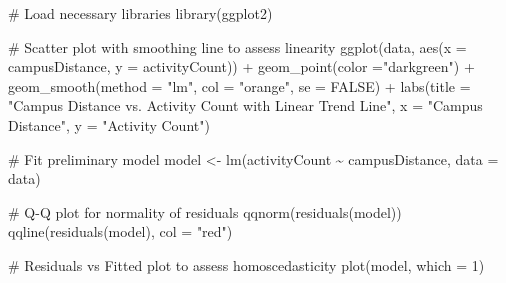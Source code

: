 \documentclass[
  letterpaper,
  DIV=11,
  numbers=noendperiod]{scrartcl}
\newenvironment{Shaded}{\begin{snugshade}}{\end{snugshade}}
\newcommand{\AttributeTok}[1]{\textcolor[rgb]{0.40,0.45,0.13}{#1}}
\newcommand{\CommentTok}[1]{\textcolor[rgb]{0.37,0.37,0.37}{#1}}
\newcommand{\ConstantTok}[1]{\textcolor[rgb]{0.56,0.35,0.01}{#1}}
\newcommand{\DecValTok}[1]{\textcolor[rgb]{0.68,0.00,0.00}{#1}}
\newcommand{\FunctionTok}[1]{\textcolor[rgb]{0.28,0.35,0.67}{#1}}
\newcommand{\NormalTok}[1]{\textcolor[rgb]{0.00,0.23,0.31}{#1}}
\newcommand{\OtherTok}[1]{\textcolor[rgb]{0.00,0.23,0.31}{#1}}
\newcommand{\SpecialCharTok}[1]{\textcolor[rgb]{0.37,0.37,0.37}{#1}}
\newcommand{\StringTok}[1]{\textcolor[rgb]{0.13,0.47,0.30}{#1}}
\begin{document}
\begin{Shaded}
\begin{Highlighting}[]
\CommentTok{\# Load necessary libraries}
\FunctionTok{library}\NormalTok{(ggplot2)}

\CommentTok{\# Scatter plot with smoothing line to assess linearity}
\FunctionTok{ggplot}\NormalTok{(data, }\FunctionTok{aes}\NormalTok{(}\AttributeTok{x =}\NormalTok{ campusDistance, }\AttributeTok{y =}\NormalTok{ activityCount)) }\SpecialCharTok{+}
  \FunctionTok{geom\_point}\NormalTok{(}\AttributeTok{color =}\StringTok{"darkgreen"}\NormalTok{) }\SpecialCharTok{+}
  \FunctionTok{geom\_smooth}\NormalTok{(}\AttributeTok{method =} \StringTok{"lm"}\NormalTok{, }\AttributeTok{col =} \StringTok{"orange"}\NormalTok{, }\AttributeTok{se =} \ConstantTok{FALSE}\NormalTok{) }\SpecialCharTok{+}
  \FunctionTok{labs}\NormalTok{(}\AttributeTok{title =} \StringTok{"Campus Distance vs. Activity Count with Linear Trend Line"}\NormalTok{,}
       \AttributeTok{x =} \StringTok{"Campus Distance"}\NormalTok{,}
       \AttributeTok{y =} \StringTok{"Activity Count"}\NormalTok{)}
\end{Highlighting}
\end{Shaded}

\begin{Shaded}
\begin{Highlighting}[]
\CommentTok{\# Fit preliminary model}
\NormalTok{model }\OtherTok{\textless{}{-}} \FunctionTok{lm}\NormalTok{(activityCount }\SpecialCharTok{\textasciitilde{}}\NormalTok{ campusDistance, }\AttributeTok{data =}\NormalTok{ data)}

\CommentTok{\# Q{-}Q plot for normality of residuals}
\FunctionTok{qqnorm}\NormalTok{(}\FunctionTok{residuals}\NormalTok{(model))}
\FunctionTok{qqline}\NormalTok{(}\FunctionTok{residuals}\NormalTok{(model), }\AttributeTok{col =} \StringTok{"red"}\NormalTok{)}
\end{Highlighting}
\end{Shaded}

\begin{Shaded}
\begin{Highlighting}[]
\CommentTok{\# Residuals vs Fitted plot to assess homoscedasticity}
\FunctionTok{plot}\NormalTok{(model, }\AttributeTok{which =} \DecValTok{1}\NormalTok{)}
\end{Highlighting}
\end{Shaded}
\end{document}

